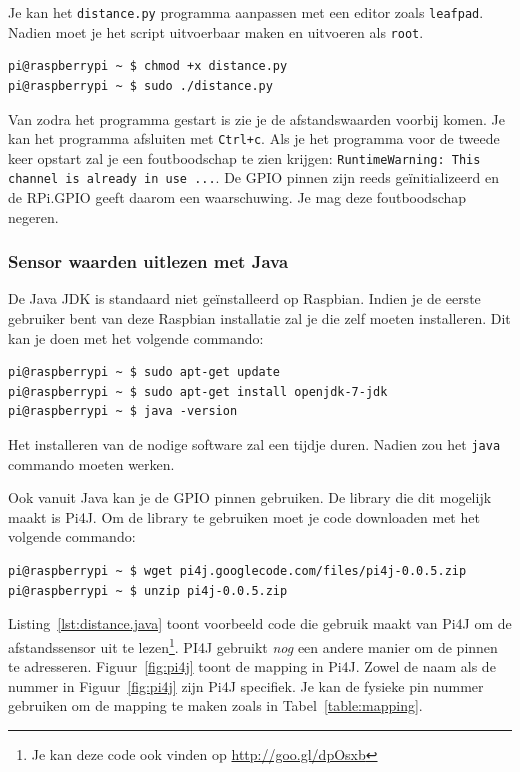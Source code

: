\documentclass[a4paper]{article}
\begin{document}
  Je kan het \texttt{distance.py} programma aanpassen met een editor
zoals \texttt{leafpad}.  Nadien moet je het script uitvoerbaar maken
en uitvoeren als \texttt{root}.

\begin{lstlisting}
pi@raspberrypi ~ $ chmod +x distance.py
pi@raspberrypi ~ $ sudo ./distance.py
\end{lstlisting}

  Van zodra het programma gestart is zie je de afstandswaarden voorbij
komen.  Je kan het programma afsluiten met \texttt{Ctrl+c}.  Als je
het programma voor de tweede keer opstart zal je een foutboodschap te
zien krijgen: \texttt{RuntimeWarning: This channel is already in use
...}.  De GPIO pinnen zijn reeds ge\"initializeerd en de RPi.GPIO
geeft daarom een waarschuwing.  Je mag deze foutboodschap negeren.

    \subsubsection{Sensor waarden uitlezen met Java}

    De Java JDK is standaard niet ge\"installeerd op Raspbian.
Indien je de eerste gebruiker bent van deze Raspbian installatie zal je
die zelf moeten installeren.  Dit kan je doen met het volgende commando:
\begin{lstlisting}
pi@raspberrypi ~ $ sudo apt-get update
pi@raspberrypi ~ $ sudo apt-get install openjdk-7-jdk
pi@raspberrypi ~ $ java -version
\end{lstlisting}

    Het installeren van de nodige software zal een tijdje duren.
Nadien zou het \texttt{java} commando moeten werken.

    Ook vanuit Java kan je de GPIO pinnen gebruiken.  De library die
dit mogelijk maakt is Pi4J.  Om de library te gebruiken moet je code
downloaden met het volgende commando:
\begin{lstlisting}
pi@raspberrypi ~ $ wget pi4j.googlecode.com/files/pi4j-0.0.5.zip
pi@raspberrypi ~ $ unzip pi4j-0.0.5.zip
\end{lstlisting}

    Listing~\ref{lst:distance.java} toont voorbeeld code die gebruik
maakt van Pi4J om de afstandssensor uit te lezen\footnote{Je kan deze
code ook vinden op \url{http://goo.gl/dpOsxb}}.  PI4J gebruikt
\emph{nog} een andere manier om de pinnen te adresseren.
Figuur~\ref{fig:pi4j} toont de mapping in Pi4J.  Zowel de naam als de
nummer in Figuur~\ref{fig:pi4j} zijn Pi4J specifiek.  Je kan de
fysieke pin nummer gebruiken om de mapping te maken zoals in
Tabel~\ref{table:mapping}.
\end{document}
